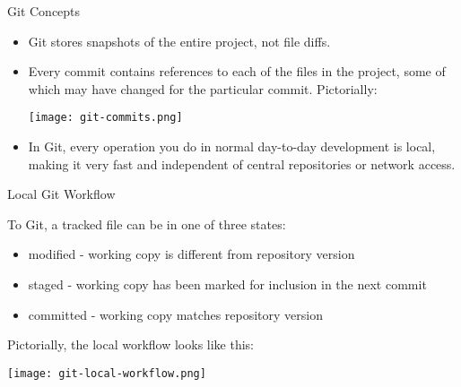 \documentclass{beamer}
\begin{document}
\begin{frame}[fragile]{Git Concepts}

\begin{itemize}
\item Git stores snapshots of the entire project, not file diffs.
\item Every commit contains references to each of the files in the project, some of which may have changed for the particular commit. Pictorially:
\begin{center}
\texttt{[image: git-commits.png]}
\end{center}
\item In Git, every operation you do in normal day-to-day development is local, making it very fast and independent of central repositories or network access.
\end{itemize}


\end{frame}

\begin{frame}[fragile]{Local Git Workflow}


To Git, a tracked file can be in one of three states:
\begin{itemize}
\item modified - working copy is different from repository version
\item staged - working copy has been marked for inclusion in the next commit
\item committed - working copy matches repository version
\end{itemize}
Pictorially, the local workflow looks like this:
\begin{center}
\texttt{[image: git-local-workflow.png]}
\end{center}

\end{frame}
\end{document}
